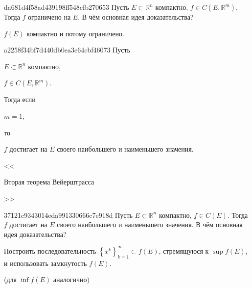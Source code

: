 \begin{note}{da681d4f58ad439198ff548cfb270653}
    Пусть \({ E \subset \mathbb R^{n} }\) компактно,\: \({ f \in C(E, \mathbb R^{m}) }\).
    Тогда \({ f }\) ограничено на \({ E }\).
    В чём основная идея доказательства?

    \begin{cloze}{1}
        \({ f(E) }\) компактно и потому ограничено.
    \end{cloze}
\end{note}

\begin{note}{a2258f34bf7d440db0ea3e64cbf46073}
    Пусть \begin{icloze}{3}\({ E \subset \mathbb R^{n} }\) компактно,\end{icloze}\: \begin{icloze}{4}\({ f \in C(E, \mathbb R^{m}) }\).\end{icloze}
    Тогда если \begin{icloze}{2}\({ m = 1 }\),\end{icloze} то \begin{icloze}{1}\({ f }\) достигает на \({ E }\) своего наибольшего и наименьшего значения.\end{icloze}

    \begin{center}
        \tiny
        <<\begin{icloze}{5}Вторая теорема Вейерштрасса\end{icloze}>>
    \end{center}
\end{note}

\begin{note}{37121c9343014eda991330666c7e918d}
    Пусть \({ E \subset \mathbb R^{n} }\) компактно,\: \({ f \in C(E) }\).
    Тогда \({ f }\) достигает на \({ E }\) своего наибольшего и наименьшего значения.
    В чём основная идея доказательства?

    \begin{cloze}{1}
        Построить последовательность \({ \left\{ x^{k} \right\}_{k = 1}^{\infty} \subset f(E) }\), стремящуюся к \({ \sup f(E) }\), и использовать замкнутость \({ f(E) }\).

        \begin{center}
            \tiny
            (для \({ \inf f(E) }\) аналогично)
        \end{center}
    \end{cloze}
\end{note}

